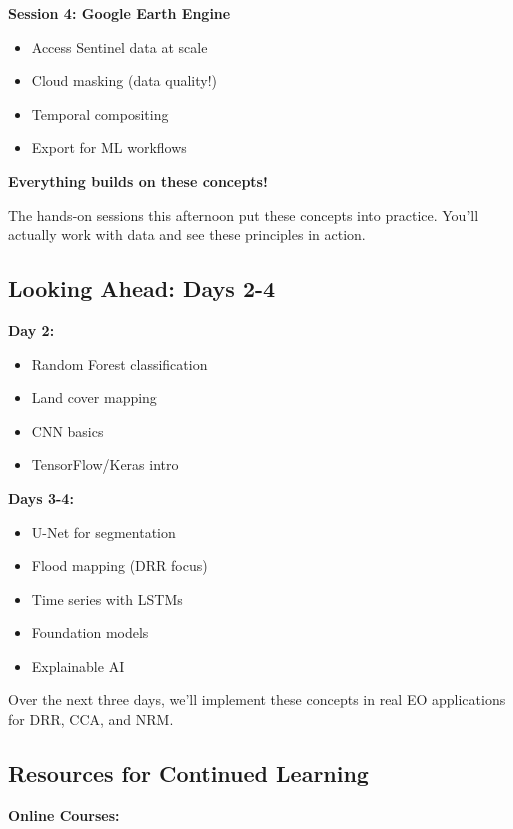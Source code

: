 \documentclass[
  letterpaper,
  DIV=11,
  numbers=noendperiod]{scrartcl}
\providecommand{\tightlist}{%
  \setlength{\itemsep}{0pt}\setlength{\parskip}{0pt}}
\begin{document}
\textbf{Session 4: Google Earth Engine}

\begin{itemize}
\tightlist
\item
  Access Sentinel data at scale
\item
  Cloud masking (data quality!)
\item
  Temporal compositing
\item
  Export for ML workflows
\end{itemize}

\textbf{Everything builds on these concepts!}

The hands-on sessions this afternoon put these concepts into practice.
You'll actually work with data and see these principles in action.

\subsection{Looking Ahead: Days 2-4}\label{looking-ahead-days-2-4}

\textbf{Day 2:}

\begin{itemize}
\tightlist
\item
  Random Forest classification
\item
  Land cover mapping
\item
  CNN basics
\item
  TensorFlow/Keras intro
\end{itemize}

\textbf{Days 3-4:}

\begin{itemize}
\tightlist
\item
  U-Net for segmentation
\item
  Flood mapping (DRR focus)
\item
  Time series with LSTMs
\item
  Foundation models
\item
  Explainable AI
\end{itemize}

Over the next three days, we'll implement these concepts in real EO
applications for DRR, CCA, and NRM.

\subsection{Resources for Continued
Learning}\label{resources-for-continued-learning}

\textbf{Online Courses:}
\end{document}
